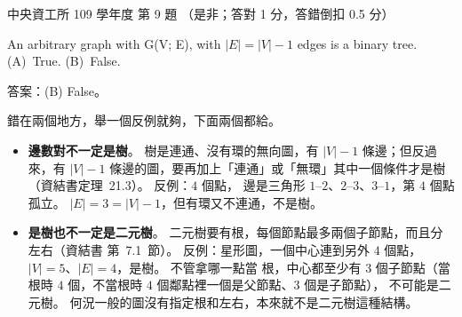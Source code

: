 \begin{pastexam}[label={px:ncu-109-dsa-09}]{中央資工所 109 學年度 第 9 題}
（是非；答對 1 分，答錯倒扣 0.5 分）

An arbitrary graph with G(V; E), with $|E|=|V|-1$ edges is a binary tree.\\
(A)~True. \qquad (B)~False.
\end{pastexam}

\begin{pastsoln}
答案：(B) False。

錯在兩個地方，舉一個反例就夠，下面兩個都給。
\begin{itemize}
\item \textbf{邊數對不一定是樹}。 樹是連通、沒有環的無向圖，有 $|V| - 1$ 條邊；但反過來，有 $|V| - 1$
條邊的圖，要再加上「連通」或「無環」其中一個條件才是樹（資結書定理~21.3）。 反例：$4$ 個點，
邊是三角形 $1$--$2$、$2$--$3$、$3$--$1$，第 $4$ 個點孤立。 $|E| = 3 = |V| - 1$，但有環又不連通，不是樹。
\item \textbf{是樹也不一定是二元樹}。 二元樹要有根，每個節點最多兩個子節點，而且分左右（資結書
第~7.1~節）。 反例：星形圖，一個中心連到另外 $4$ 個點，$|V| = 5$、$|E| = 4$，是樹。 不管拿哪一點當
根，中心都至少有 $3$ 個子節點（當根時 $4$ 個，不當根時 $4$ 個鄰點裡一個是父節點、$3$ 個是子節點），
不可能是二元樹。 何況一般的圖沒有指定根和左右，本來就不是二元樹這種結構。
\end{itemize}
\end{pastsoln}
